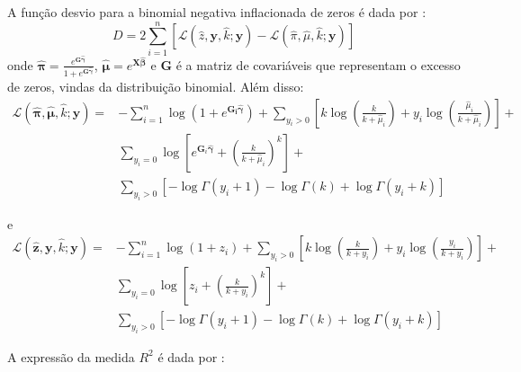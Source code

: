 \documentclass[12pt, a4paper, twoside]{report}
\numberwithin{equation}{section} %
\begin{document}

A função desvio para a binomial negativa inflacionada de zeros é dada por \citep{martin2016}:
\begin{equation}
    D = 2\sum_{i=1}^n[\mathcal{L}(\hat{z},\textbf{y},\hat{k};\textbf{y}) - \mathcal{L}(\hat{\pi},\hat{\mu},\hat{k};\textbf{y})]
\end{equation}
onde $\boldsymbol{\hat{\pi}}=\frac{e^{\boldsymbol{G\hat{\gamma}}}}{1+e^{\boldsymbol{G\hat{\gamma}}}}$, $\boldsymbol{\hat{\mu}}=e^{\boldsymbol{X\hat{\beta}}}$ e $\boldsymbol{G}$ é a matriz de covariáveis que representam o excesso de zeros, vindas da distribuição binomial. Além disso:
\begin{equation}
    \begin{aligned}
\mathcal{L}(\hat{\boldsymbol{\pi}}, \hat{\boldsymbol{\mu}}, \hat{k} ; \boldsymbol{y})= & -\sum_{i=1}^n \log \left(1+e^{\boldsymbol{G}_{\boldsymbol{i}} \hat{\boldsymbol{\gamma}}}\right)+\sum_{y_i>0}\left[k \log \left(\frac{k}{k+\hat{\mu}_i}\right)+y_i \log \left(\frac{\hat{\mu}_i}{k+\hat{\mu}_i}\right)\right]+ \\
& \sum_{y_i=0} \log \left[e^{\boldsymbol{G}_i \hat{\boldsymbol{\gamma}}}+\left(\frac{k}{k+\hat{\mu}_i}\right)^k\right]+ \\
& \sum_{y_i>0}\left[-\log \Gamma\left(y_i+1\right)-\log \Gamma(k)+\log \Gamma\left(y_i+k\right)\right]
\end{aligned}
\end{equation}

e
\begin{equation}
    \begin{aligned}
\mathcal{L}(\hat{\boldsymbol{z}}, \boldsymbol{y}, \hat{k} ; \boldsymbol{y})= & -\sum_{i=1}^n \log \left(1+z_i\right)+\sum_{y_i>0}\left[k \log \left(\frac{k}{k+y_i}\right)+y_i \log \left(\frac{y_i}{k+y_i}\right)\right]+ \\
& \sum_{y_i=0} \log \left[z_i+\left(\frac{k}{k+y_i}\right)^k\right]+ \\
& \sum_{y_i>0}\left[-\log \Gamma\left(y_i+1\right)-\log \Gamma(k)+\log \Gamma\left(y_i+k\right)\right]
\end{aligned}
\end{equation}

A expressão da medida $R^2$ é dada por \citep{martin2016}:
\end{document}
